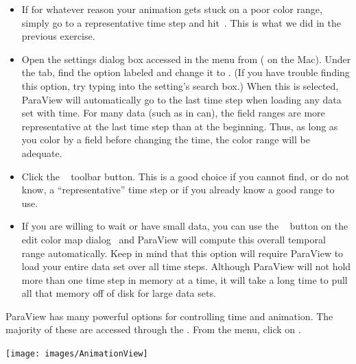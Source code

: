 \begin{itemize}
\item If for whatever reason your animation gets stuck on a poor color
  range, simply go to a representative time step and
  hit~.  This is what we did in the previous exercise.
\item Open the settings dialog box accessed in the menu from  \ra
   ( \ra {} on the Mac).  Under
  the  tab, find the option labeled  and change it to . (If you have trouble finding this option, try typing
   into the setting's search box.) When this is selected,
  ParaView will automatically go to the last time step when loading any
  data set with time.  For many data (such as in can), the field ranges are
  more representative at the last time step than at the beginning.  Thus,
  as long as you color by a field before changing the time, the color range
  will be adequate.
\item {}  Click the
  ~ toolbar
  button. This is a good choice if you cannot find, or do not know, a
  ``representative'' time step or if you already know a good range to
  use.
\item If you are willing to wait or have small data, you can use the
  ~ button on the edit color map
  dialog~ and ParaView will compute this overall
  temporal range automatically.  Keep in mind that this option will require
  ParaView to load your entire data set over all time steps.  Although
  ParaView will not hold more than one time step in memory at a time, it
  will take a long time to pull all that memory off of disk for large data
  sets.
\end{itemize}

ParaView has many powerful options for controlling time and animation.  The
majority of these are accessed through the .  From
the menu, click on  \ra {}.

\begin{inlinefig}
  \texttt{[image: images/AnimationView]}
\end{inlinefig}


